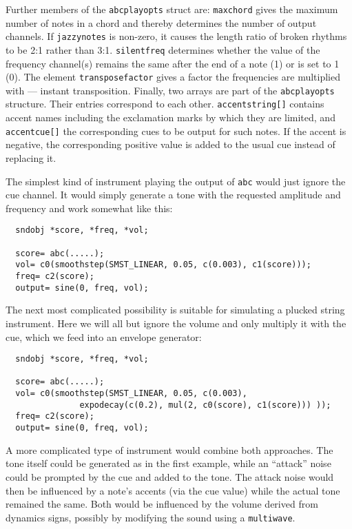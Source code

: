 \documentclass{article}
\def\bv{\begin{verbatim}}
\begin{document}
Further members of the {\tt abcplayopts} struct are: {\tt maxchord} gives the
maximum number of notes in a chord and thereby determines the number of output
channels.  If {\tt jazzynotes} is non-zero, it causes the length ratio of
broken rhythms to be 2:1 rather than 3:1.  {\tt silentfreq} determines whether
the value of the frequency channel(s) remains the same after the end of a note
(1) or is set to 1 (0).  The element {\tt transposefactor} gives a factor the
frequencies are multiplied with --- instant transposition.  Finally, two arrays
are part of the {\tt abcplayopts} structure.  Their entries correspond to each
other.  {\tt accentstring[]} contains accent names including the exclamation
marks by which they are limited, and {\tt accentcue[]} the corresponding cues
to be output for such notes.  If the accent is negative, the corresponding
positive value is added to the usual cue instead of replacing it.

The simplest kind of instrument playing the output of {\tt abc} would just
ignore the cue channel.  It would simply generate a tone with the requested
amplitude and frequency and work somewhat like this:

\bv
  sndobj *score, *freq, *vol;

  score= abc(.....);
  vol= c0(smoothstep(SMST_LINEAR, 0.05, c(0.003), c1(score)));
  freq= c2(score);
  output= sine(0, freq, vol);
\end{verbatim}

The next most complicated possibility is suitable for simulating a plucked
string instrument.  Here we will all but ignore the volume and only multiply
it with the cue, which we feed into an envelope generator:

\bv
  sndobj *score, *freq, *vol;

  score= abc(.....);
  vol= c0(smoothstep(SMST_LINEAR, 0.05, c(0.003), 
               expodecay(c(0.2), mul(2, c0(score), c1(score))) ));
  freq= c2(score);
  output= sine(0, freq, vol);
\end{verbatim}

A more complicated type of instrument would combine both approaches.  The tone
itself could be generated as in the first example, while an ``attack'' noise
could be prompted by the cue and added to the tone.  The attack noise would
then be influenced by a note's accents (via the cue value) while the actual
tone remained the same.  Both would be influenced by the volume derived from
dynamics signs, possibly by modifying the sound using a {\tt multiwave}.
\end{document}
